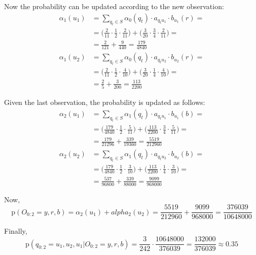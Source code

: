 {\begin{itemize}
		Now the probability can be updated according to the new observation:
		\begin{align*}
		\alpha_1(u_1) & = \sum_{q_t \in S} \alpha_0(q_t) \cdot a_{q_t u_1} 
		\cdot b_{u_1}(r) = \\
		& = \bigg( \frac{2}{11} \cdot \frac{1}{2} \cdot \frac{2}{11} 
		\bigg) + \bigg( \frac{3}{20} \cdot \frac{3}{4} \cdot \frac{2}{11} 
		\bigg) = \\
		& =\frac{2}{121} + \frac{9}{440} = \frac{179}{4840} 
		\\[15pt]
		\alpha_1(u_2) & = \sum_{q_t \in S} \alpha_0(q_t) \cdot a_{q_t u_2} 
		\cdot b_{u_2}(r) = \\
		& =\bigg( \frac{2}{11} \cdot \frac{1}{2} \cdot \frac{4}{10} 
		\bigg) + \bigg( \frac{3}{20} \cdot \frac{1}{4} \cdot \frac{4}{10} 
		\bigg) = \\
		& =\frac{2}{5} + \frac{3}{200} = \frac{113}{2200} 
		\end{align*}
		
		Given the last observation, the probability is updated as follows:
		\begin{align*}
		\alpha_2(u_1) & = \sum_{q_t \in S} \alpha_1(q_t) \cdot a_{q_t u_1} 
		\cdot b_{u_1}(b) = \\
		& = \bigg( \frac{179}{4840} \cdot \frac{1}{2} \cdot \frac{5}{11} 
		\bigg) + \bigg( \frac{113}{2200} \cdot \frac{3}{4} \cdot \frac{5}{11} 
		\bigg) = \\
		& =\frac{179}{21296} + \frac{339}{19360} = \frac{5519}{212960} 
		\\[15pt]
		\alpha_2(u_2) & = \sum_{q_t \in S} \alpha_1(q_t) \cdot a_{q_t u_2} 
		\cdot b_{u_2}(b) = \\
		& =\bigg( \frac{179}{4840} \cdot \frac{1}{2} \cdot \frac{3}{10} 
		\bigg) + \bigg( \frac{113}{2200} \cdot \frac{1}{4} \cdot \frac{3}{10} 
		\bigg) = \\
		& =\frac{537}{96800} + \frac{339}{88000} = \frac{9099}{968000} 
		\end{align*}
		
		Now, 
		\begin{equation*}
		\mathrm{p}(O_{0:2}=y,r,b) = \alpha_2(u_1) + alpha_2(u_2)  = 
		\frac{5519}{212960} + \frac{9099}{968000} = \frac{376039}{10648000} 
		\end{equation*}
		
		Finally, 
		\begin{equation*}
		\mathrm{p}(q_{0:2}=u_1,u_2, u_1 | O_{0:2}=y,r,b)= \frac{3}{242} 
		\cdot \frac{10648000}{376039} = \frac{132000}{376039} \approx 0.35
		\end{equation*}
	\end{itemize}
}

